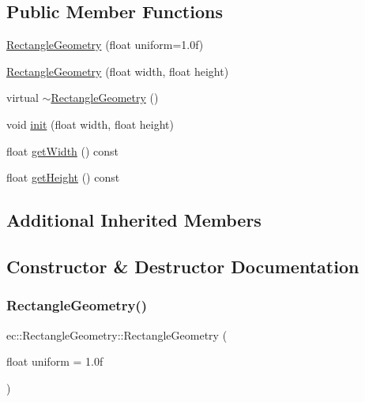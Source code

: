 \subsection*{Public Member Functions}
\begin{DoxyCompactItemize}
\item 
\mbox{\hyperlink{classec_1_1_rectangle_geometry_a32727c2f9bca52cec764627b9a5c27ec}{Rectangle\+Geometry}} (float uniform=1.\+0f)
\item 
\mbox{\hyperlink{classec_1_1_rectangle_geometry_aa1b327fbb455fe591c75b035882695cf}{Rectangle\+Geometry}} (float width, float height)
\item 
virtual \mbox{\hyperlink{classec_1_1_rectangle_geometry_ade8488c66850e8c5e858889dc9b266d8}{$\sim$\+Rectangle\+Geometry}} ()
\item 
void \mbox{\hyperlink{classec_1_1_rectangle_geometry_ac6dd804a2fa2b253b71408dae5a08265}{init}} (float width, float height)
\item 
float \mbox{\hyperlink{classec_1_1_rectangle_geometry_a1f75cd7d531e23fe3ccaff67178e0a08}{get\+Width}} () const
\item 
float \mbox{\hyperlink{classec_1_1_rectangle_geometry_a54989d6e1a08afb8f327bd06a4c2e93b}{get\+Height}} () const
\end{DoxyCompactItemize}
\subsection*{Additional Inherited Members}


\subsection{Constructor \& Destructor Documentation}
\mbox{\label{classec_1_1_rectangle_geometry_a32727c2f9bca52cec764627b9a5c27ec}} 
\subsubsection{\texorpdfstring{Rectangle\+Geometry()}{RectangleGeometry()}\hspace{0.1cm}{\footnotesize\ttfamily [1/2]}}
{\footnotesize\ttfamily ec\+::\+Rectangle\+Geometry\+::\+Rectangle\+Geometry (\begin{DoxyParamCaption}\item[{float}]{uniform = {\ttfamily 1.0f} }\end{DoxyParamCaption})\hspace{0.3cm}{\ttfamily [explicit]}}

